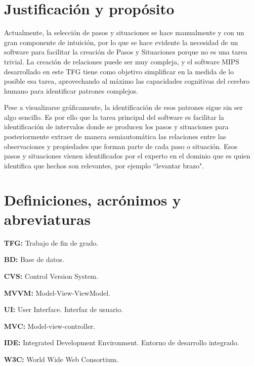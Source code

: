\section{Justificaci\'{o}n y prop\'osito}
Actualmente, la selecci\'on de pasos y situaciones se hace manualmente y con un gran componente de intuici\'on,
por lo que se hace evidente la necesidad de un software para facilitar la creaci\'on de Pasos y Situaciones porque
no es una tarea trivial. La creaci\'on de relaciones puede ser muy compleja, y el software MIPS desarrollado
en este TFG
tiene como objetivo simplificar en la medida de lo posible esa tarea, aprovechando al m\'aximo las capacidades
cognitivas del cerebro humano para identificar
patrones complejos. 

Pese a visualizarse gr\'aficamente, la identificaci\'on de esos patrones sigue sin ser algo sencillo. Es
por ello que la tarea principal del software es facilitar la identificaci\'on de intervalos donde se producen los
pasos y situaciones para posteriormente extraer de manera semiautom\'atica las relaciones entre las observaciones y
propiedades que forman parte de cada paso o situaci\'on. Esos pasos y situaciones vienen identificados por el
experto en el dominio que es quien identifica que hechos son relevantes, por ejemplo
``levantar brazo".

\section{Definiciones, acr\'{o}nimos y abreviaturas}
\textbf{TFG:} Trabajo de fin de grado.

\textbf{BD:} Base de datos.

\textbf{CVS:} Control Version System.

\textbf{MVVM:} Model-View-ViewModel.

\textbf{UI:} User Interface. Interfaz de usuario.

\textbf{MVC:} Model-view-controller.

\textbf{IDE:} Integrated Development Environment. Entorno de desarrollo integrado.

\textbf{W3C:} World Wide Web Consortium.
 
